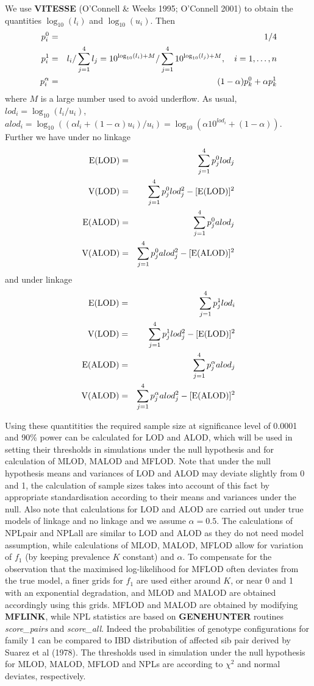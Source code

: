 \noindent
We use {\bf VITESSE} (O'Connell \& Weeks 1995; O'Connell 2001) to obtain the
quantities $\log_{10}(l_i)$ and $\log_{10}(u_i)$. Then
\begin{eqnarray*}
p_i^0 &=& 1/4 \cr
p_i^1 &=& l_i/\sum_{j=1}^4l_j=10^{\log_{10}(l_i)+M}/\sum_{j=1}^410^{\log_{10}(l_j)+M},\quad i=1, \ldots, n\cr
p_i^\alpha &=& (1-\alpha)p_k^0+\alpha p_k^1
\end{eqnarray*}
where $M$ is a large number used to avoid underflow. As usual,
$lod_i=\log_{10}(l_i/u_i)$, $alod_i=\log_{10}((\alpha
l_i+(1-\alpha)u_i)/u_i)=\log_{10}(\alpha 10^{lod_i}+(1-\alpha))$.
Further we have under no linkage
\begin{eqnarray*}
\mbox{E(LOD)}  &=& \sum_{j=1}^4p_j^0lod_j\cr
\mbox{V(LOD)}  &=& \sum_{j=1}^4p_j^0lod_j^2-[\mbox{E(LOD)}]^2\cr
\mbox{E(ALOD)} &=& \sum_{j=1}^4p_j^0alod_j \cr
\mbox{V(ALOD)} &=& \sum_{j=1}^4p_j^0alod_j^2-[\mbox{E(ALOD)}]^2
\end{eqnarray*}
and under linkage
\begin{eqnarray*}
\mbox{E(LOD)}  &=& \sum_{j=1}^4p_j^1lod_i \cr
\mbox{V(LOD)}  &=& \sum_{j=1}^4p_j^1lod_j^2-[\mbox{E(LOD)}]^2 \cr
\mbox{E(ALOD)} &=& \sum_{j=1}^4p_j^\alpha alod_j \cr
\mbox{V(ALOD)} &=& \sum_{j=1}^4p_j^\alpha alod_j^2-[\mbox{E(ALOD)}]^2
\end{eqnarray*}

Using these quantitities the required sample size at significance level of
0.0001 and 90\% power can be calculated for LOD and ALOD, which will be
used in setting their thresholds in simulations under the null hypothesis
and for calculation of MLOD, MALOD and MFLOD.  Note that under the null
hypothesis means and variances of LOD and ALOD may deviate slightly from 0
and 1, the calculation of sample sizes takes into account of this fact by
appropriate standardisation according to their means and variances under
the null.  Also note that calculations for LOD and ALOD are carried out
under true models of linkage and no linkage and we assume $\alpha=0.5$.  
The calculations of NPLpair and NPLall are similar to LOD and ALOD as they
do not need model assumption, while calculations of MLOD, MALOD, MFLOD
allow for variation of $f_1$ (by keeping prevalence $K$ constant) and
$\alpha$.  To compensate for the observation that the maximised
log-likelihood for MFLOD often deviates from the true model, a finer grids
for $f_1$ are used either around $K$, or near 0 and 1 with an exponential
degradation, and MLOD and MALOD are obtained accordingly using this grids.  
MFLOD and MALOD are obtained by modifying {\bf MFLINK}, while NPL
statistics are based on {\bf GENEHUNTER} routines {\em score\_pairs} and
{\em score\_all}.  Indeed the probabilities of genotype configurations for
family 1 can be compared to IBD distribution of affected sib pair derived
by Suarez et al (1978).  The thresholds used in simulation under the null
hypothesis for MLOD, MALOD, MFLOD and NPLs are according to $\chi^2$ and
normal deviates, respectively.

